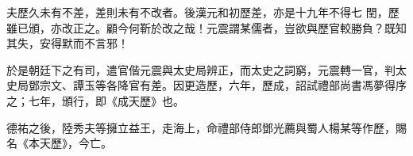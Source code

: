 \begin{pinyinscope}
 夫歷久未有不差，差則未有不改者。後漢元和初歷差，亦是十九年不得七
 閏，歷雖已頒，亦改正之。顧今何靳於改之哉！元震謂某儒者，豈欲與歷官較勝負？既知其失，安得默而不言邪！



 於是朝廷下之有司，遣官偕元震與太史局辨正，而太史之詞窮，元震轉一官，判太史局鄧宗文、譚玉等各降官有差。因更造歷，六年，歷成，詔試禮部尚書馮夢得序之；七年，頒行，即《成天歷》也。



 德祐之後，陸秀夫等擁立益王，走海上，命禮部侍郎鄧光薦與蜀人楊某等作歷，賜名《本天歷》，今亡。



\end{pinyinscope}